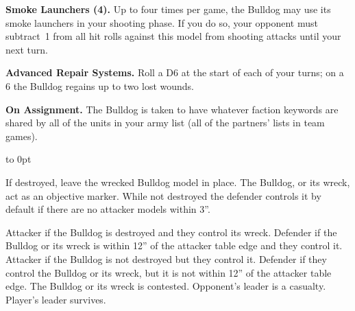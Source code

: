 \vspace*{-9pt}
  \hfill
  \begin{minipage}{6in}
  \noindent\textbf{Smoke Launchers (4).} Up to four times per game, the
  Bulldog may use its smoke launchers in your shooting phase.  If you
  do so, your opponent must subtract~1 from all hit rolls against this
  model from shooting attacks until your next turn.

  \noindent\textbf{Advanced Repair Systems.}  Roll a D6 at the start of each
  of your turns; on a 6 the Bulldog regains up to two lost wounds.

  \noindent\textbf{On Assignment.}  The Bulldog is taken to have
  whatever faction keywords are shared by all of the units in your
  army list (all of the partners' lists in team games).

  \end{minipage}
  \hfill\hbox to 0pt{}

  \vfill

  If destroyed, leave the wrecked Bulldog model in place.  The
  Bulldog, or its wreck, act as an objective marker.  While not
  destroyed the defender controls it by default if there are no
  attacker models within 3''.


  \scoringbox%
  {Attacker if the Bulldog is destroyed and they control its wreck.
    Defender if the Bulldog or its wreck is within 12'' of the
    attacker table edge and they control it.}%
  {Attacker if the Bulldog is not destroyed but they control it.
    Defender if they control the Bulldog or its wreck, but it is not
    within 12'' of the attacker table edge.}%
  {The Bulldog or its wreck is contested.}%
  {Opponent's leader is a casualty.}%
  {Player's leader survives.}

